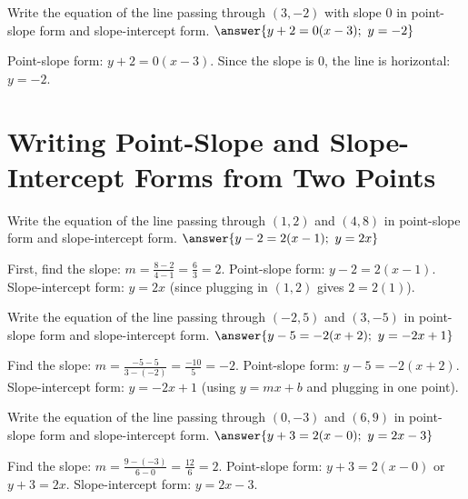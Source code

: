\documentclass{ximera}
\begin{document}
\begin{problem}
Write the equation of the line passing through $(3, -2)$ with slope $0$ in point-slope form and slope-intercept form. $\answer{y + 2 = 0(x - 3);\ y = -2}$
\begin{feedback}
Point-slope form: $y + 2 = 0(x - 3)$. Since the slope is $0$, the line is horizontal: $y = -2$.
\end{feedback}
\end{problem}




\section*{Writing Point-Slope and Slope-Intercept Forms from Two Points}

\begin{problem}
Write the equation of the line passing through $(1, 2)$ and $(4, 8)$ in point-slope form and slope-intercept form. $\answer{y - 2 = 2(x - 1);\ y = 2x}$ 
\begin{feedback}
First, find the slope: $m = \frac{8 - 2}{4 - 1} = \frac{6}{3} = 2$.  
Point-slope form: $y - 2 = 2(x - 1)$.  
Slope-intercept form: $y = 2x$ (since plugging in $(1, 2)$ gives $2 = 2(1)$).
\end{feedback}
\end{problem}

\begin{problem}
Write the equation of the line passing through $(-2, 5)$ and $(3, -5)$ in point-slope form and slope-intercept form. $\answer{y - 5 = -2(x + 2);\ y = -2x + 1}$
\begin{feedback}
Find the slope: $m = \frac{-5 - 5}{3 - (-2)} = \frac{-10}{5} = -2$.  
Point-slope form: $y - 5 = -2(x + 2)$.  
Slope-intercept form: $y = -2x + 1$ (using $y = mx + b$ and plugging in one point).
\end{feedback}
\end{problem}

\begin{problem}
Write the equation of the line passing through $(0, -3)$ and $(6, 9)$ in point-slope form and slope-intercept form. $\answer{y + 3 = 2(x - 0);\ y = 2x - 3}$
\begin{feedback}
Find the slope: $m = \frac{9 - (-3)}{6 - 0} = \frac{12}{6} = 2$.  
Point-slope form: $y + 3 = 2(x - 0)$ or $y + 3 = 2x$.  
Slope-intercept form: $y = 2x - 3$.
\end{feedback}
\end{problem}
\end{document}
